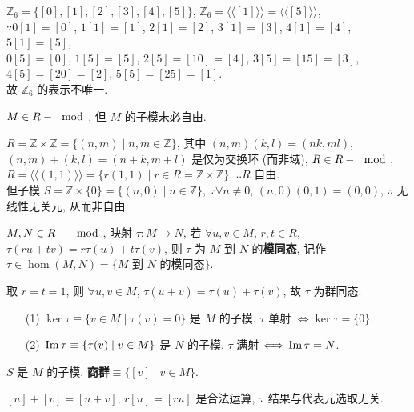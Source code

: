 \documentclass{note}
\begin{document}
\begin{eg}
    $\mathbb{Z}_6=\{[0],[1],[2],[3],[4],[5]\}$, $\mathbb{Z}_6=\langle\langle[1]\rangle\rangle=\langle\langle[5]\rangle\rangle$,\\
    $\because 0[1]=[0]$, $1[1]=[1]$, $2[1]=[2]$, $3[1]=[3]$, $4[1]=[4]$, $5[1]=[5]$,\\
    $0[5]=[0]$, $1[5]=[5]$, $2[5]=[10]=[4]$, $3[5]=[15]=[3]$, $4[5]=[20]=[2]$, $5[5]=[25]=[1]$.\\
    故 $\mathbb{Z}_6$ 的表示不唯一.
\end{eg}

$M\in R-\mod$, 但 $M$ 的子模未必自由.
\begin{eg}
    $R=\mathbb{Z}\times\mathbb{Z}=\{(n,m)\mid n,m\in\mathbb{Z}\}$, 其中 $(n,m)(k,l)=(nk,ml)$, $(n,m)+(k,l)=(n+k,m+l)$ 是仅为交换环 (而非域), $R\in R-\mod$, $R=\langle\langle(1,1)\rangle\rangle=\{r(1,1)\mid r\in R=\mathbb{Z}\times\mathbb{Z}\}$, $\therefore R$ 自由.\\
    但子模 $S=\mathbb{Z}\times\{0\}=\{(n,0)\mid n\in\mathbb{Z}\}$, $\because\forall n\neq 0$, $(n,0)(0,1)=(0,0)$, $\therefore$ 无线性无关元, 从而非自由.
\end{eg}

\begin{df}[模同态]
    $M,N\in R-\mod$, 映射 $\tau:M\rightarrow N$, 若 $\forall u,v\in M$, $r,t\in R$, $\tau(ru+tv)=r\tau(u)+t\tau(v)$, 则 $\tau$ 为 $M$ 到 $N$ 的\textbf{模同态}, 记作 $\tau\in\hom(M,N)=\{\text{$M$ 到 $N$ 的模同态}\}$.
\end{df}

取 $r=t=1$, 则 $\forall u,v\in M$, $\tau(u+v)=\tau(u)+\tau(v)$, 故 $\tau$ 为群同态.

\begin{thm}[(课本定理 4.6)]
    \begin{itemize}
        \item[(1)] $\ker\tau\equiv\{v\in M\mid\tau(v)=0\}$ 是 $M$ 的子模. $\tau$ 单射 $\Longleftrightarrow\ker\tau=\{0\}$.
        \item[(2)] $\,\mathrm{Im}\,\tau\equiv\{\tau(v)\mid v\in M\}$ 是 $N$ 的子模. $\tau$ 满射 $\Longleftrightarrow\,\mathrm{Im}\,\tau=N$.
    \end{itemize}
\end{thm}

\begin{df}[商模]
    $S$ 是 $M$ 的子模, \textbf{商群}$\equiv\{[v]\mid v\in M\}$.
\end{df}

$[u]+[v]=[u+v]$, $r[u]=[ru]$ 是合法运算, $\because$ 结果与代表元选取无关.
\end{document}
